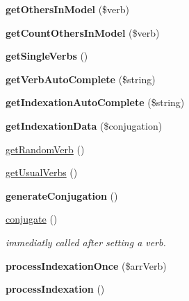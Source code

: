 \begin{DoxyCompactItemize}
{\bfseries get\+Others\+In\+Model} (\$verb)
\item 
\hypertarget{classConjugationManagerBase_a170ee674be3f030087e4e77489623e4a}{}\label{classConjugationManagerBase_a170ee674be3f030087e4e77489623e4a} 
{\bfseries get\+Count\+Others\+In\+Model} (\$verb)
\item 
\hypertarget{classConjugationManagerBase_adaa1d873ae00ca4cd2dcba8bac138b88}{}\label{classConjugationManagerBase_adaa1d873ae00ca4cd2dcba8bac138b88} 
{\bfseries get\+Single\+Verbs} ()
\item 
\hypertarget{classConjugationManagerBase_ac645c98d094ad5be6eec9950d04ee937}{}\label{classConjugationManagerBase_ac645c98d094ad5be6eec9950d04ee937} 
{\bfseries get\+Verb\+Auto\+Complete} (\$string)
\item 
\hypertarget{classConjugationManagerBase_a8686180500ee969d111c7764d52a1725}{}\label{classConjugationManagerBase_a8686180500ee969d111c7764d52a1725} 
{\bfseries get\+Indexation\+Auto\+Complete} (\$string)
\item 
\hypertarget{classConjugationManagerBase_a51e5b1141591ac39b9b92a46411b688c}{}\label{classConjugationManagerBase_a51e5b1141591ac39b9b92a46411b688c} 
{\bfseries get\+Indexation\+Data} (\$conjugation)
\item 
\hyperlink{classConjugationManagerBase_ac2e82ace9b19d7b014908ec275b552bc}{get\+Random\+Verb} ()
\item 
\hyperlink{classConjugationManagerBase_a1dff05e951fe4453247a97f5aff5bc83}{get\+Usual\+Verbs} ()
\item 
\hypertarget{classConjugationManagerBase_aa4e4c35d0affaf806ee807878a507b3e}{}\label{classConjugationManagerBase_aa4e4c35d0affaf806ee807878a507b3e} 
{\bfseries generate\+Conjugation} ()
\item 
\hyperlink{classConjugationManagerBase_a20e28aa17935e10b1a763b39a3c4fdf3}{conjugate} ()
\begin{DoxyCompactList}\small\item\em immediatly called after setting a verb. \end{DoxyCompactList}\item 
\hypertarget{classConjugationManagerBase_ad8091fd5ac8eb3c036de220ec6932234}{}\label{classConjugationManagerBase_ad8091fd5ac8eb3c036de220ec6932234} 
{\bfseries process\+Indexation\+Once} (\$arr\+Verb)
\item 
\hypertarget{classConjugationManagerBase_aa8df6ff754ed94b8771aebff95e6e3fe}{}\label{classConjugationManagerBase_aa8df6ff754ed94b8771aebff95e6e3fe} 
{\bfseries process\+Indexation} ()

\end{DoxyCompactItemize}
